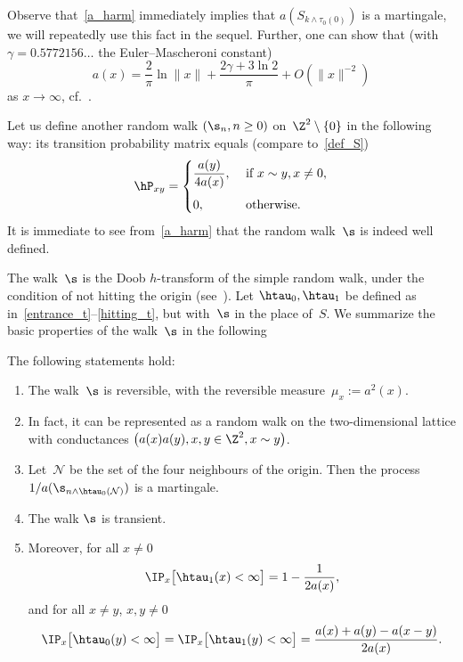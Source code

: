 Observe that~\eqref{a_harm} immediately implies that $a(S_{k\wedge \tau_0(0)})$ is a martingale, we will repeatedly use this fact in the sequel. Further, one can show that (with $\gamma=0.5772156\dots$ the Euler--Mascheroni constant)
\begin{equation}\label{formula_for_a}
a(x) = \frac{2}{\pi}\ln \|x\| + \frac{2\gamma+ 3\ln 2}{\pi} + O(\|x\|^{-2})
\end{equation}
as $x\to\infty$, cf.~\cite[Theorem~4.4.4]{LL10}.

Let us define another random walk $(\s_n, n\geq 0)$ on~$\Z^2\setminus \{0\}$ in the following way: its transition probability matrix equals (compare to~\eqref{def_S})
\begin{equation}\label{def_hatS}
\hP_{xy} =
\begin{cases}
\displaystyle\frac{a(y)}{4a(x)}, & \text{ if } x\sim y, x\neq 0,\\
0,\phantom{\int\limits^A} & \text{ otherwise.}
\end{cases}
\end{equation}
It is immediate to see from~\eqref{a_harm} that the random walk~$\s$ is indeed well defined.

The walk~$\s$ is the Doob $h$-transform of the simple random walk, under the condition of not hitting the origin (see~\cite[Lemma~3.3 and its proof]{CPV16}). Let $\htau_0, \htau_1$ be defined as in~\eqref{entrance_t}--\eqref{hitting_t}, but with~$\s$ in the place of~$S$. We summarize the basic properties of the walk~$\s$ in the following

\begin{prop}\label{p_basic_prop}
The following statements hold:
\begin{enumerate}
\item \label{1.1.1} The walk~$\s$ is reversible, with the reversible measure~$\mu_x:=a^2(x)$.
\item \label{1.1.2} In fact, it can be represented as a random walk on the two-dimensional lattice with conductances $\big(a(x)a(y), x,y\in \Z^2, x\sim y\big)$.
\item \label{1.1.3} Let~$\mathcal{N}$ be the set of the four neighbours of the origin. Then the process $1/a(\s_{n\wedge \htau_0(\mathcal{N})})$ is a martingale.
\item \label{1.1.4} The walk $\s$ is transient.
\item \label{1.1.5} Moreover, for all $x\neq 0$
\begin{equation}\label{escape_from_site}
\IP_x\big[\htau_1(x)<\infty\big] = 1-\frac{1}{2a(x)},
\end{equation}
and for all $x\neq y$, $x,y\neq 0$
\begin{equation}\label{not_hit_site}
\IP_x\big[\htau_0(y)<\infty\big] =
\IP_x\big[\htau_1(y)<\infty\big] = \frac{a(x)+a(y)-a(x-y)}{2a(x)}.
\end{equation}
\end{enumerate}
\end{prop}

